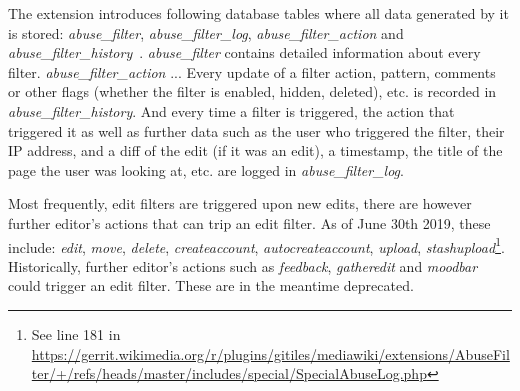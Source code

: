 The extension introduces following database tables where all data generated by it is stored: \emph{abuse\_filter}, \emph{abuse\_filter\_log}, \emph{abuse\_filter\_action} and \emph{abuse\_filter\_history}~\cite{gerrit-abusefilter-tables}.
\emph{abuse\_filter} contains detailed information about every filter.
\emph{abuse\_filter\_action} ... %
Every update of a filter action, pattern, comments or other flags (whether the filter is enabled, hidden, deleted), etc. is recorded in \emph{abuse\_filter\_history}.
And every time a filter is triggered, the action that triggered it as well as further data such as the user who triggered the filter, their IP address, and a diff of the edit (if it was an edit), a timestamp, the title of the page the user was looking at, etc. are logged in \emph{abuse\_filter\_log}.

Most frequently, edit filters are triggered upon new edits, there are however further editor's actions that can trip an edit filter.
As of June 30th 2019, these include: \emph{edit}, \emph{move}, \emph{delete}, \emph{createaccount}, \emph{autocreateaccount}, \emph{upload}, \emph{stashupload}\footnote{See line 181 in \url{https://gerrit.wikimedia.org/r/plugins/gitiles/mediawiki/extensions/AbuseFilter/+/refs/heads/master/includes/special/SpecialAbuseLog.php}}.
Historically, further editor's actions such as \emph{feedback}, \emph{gatheredit} and \emph{moodbar} could trigger an edit filter.
These are in the meantime deprecated. %

